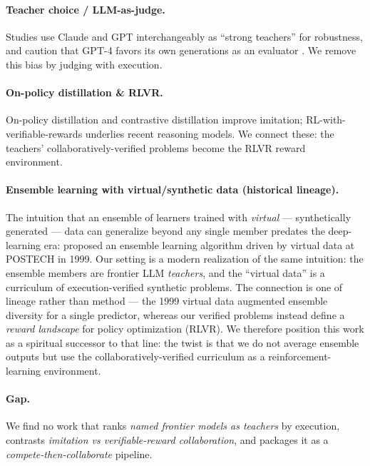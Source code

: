 \documentclass[11pt]{article}
\begin{document}
\paragraph{Teacher choice / LLM-as-judge.}
Studies use Claude and GPT interchangeably as ``strong teachers'' for robustness, and caution
that GPT-4 favors its own generations as an evaluator \citep{rlhfbook}. We remove this bias by
judging with execution.

\paragraph{On-policy distillation \& RLVR.}
On-policy distillation \citep{minillm} and contrastive distillation \citep{distillm2} improve
imitation; RL-with-verifiable-rewards underlies recent reasoning models. We connect these: the
teachers' collaboratively-verified problems become the RLVR reward environment.

\paragraph{Ensemble learning with virtual/synthetic data (historical lineage).}
The intuition that an ensemble of learners trained with \emph{virtual} --- synthetically
generated --- data can generalize beyond any single member predates the deep-learning era:
\citet{jang1999ola} proposed an ensemble learning algorithm driven by virtual data at POSTECH
in 1999. Our setting is a modern realization of the same intuition: the ensemble members are
frontier LLM \emph{teachers}, and the ``virtual data'' is a curriculum of execution-verified
synthetic problems. The connection is one of lineage rather than method --- the 1999 virtual
data augmented ensemble diversity for a single predictor, whereas our verified problems instead
define a \emph{reward landscape} for policy optimization (RLVR). We therefore position this work
as a spiritual successor to that line: the twist is that we do not average ensemble outputs but
use the collaboratively-verified curriculum as a reinforcement-learning environment.

\paragraph{Gap.}
We find no work that ranks \emph{named frontier models as teachers} by execution, contrasts
\emph{imitation vs verifiable-reward collaboration}, and packages it as a
\emph{compete-then-collaborate} pipeline.
\end{document}
